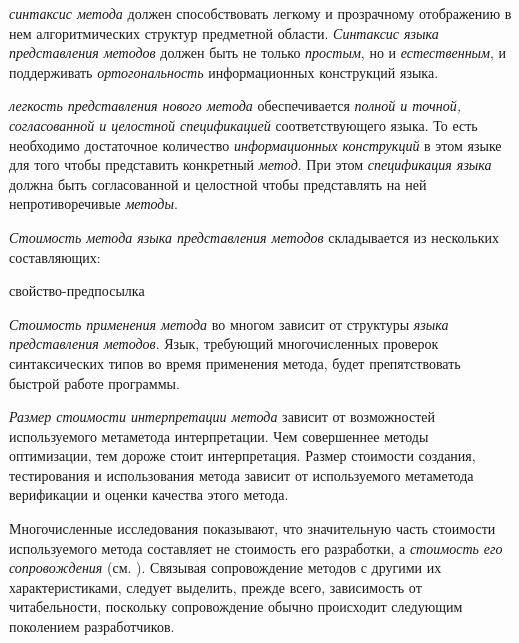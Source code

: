 \textit{синтаксис метода} должен способствовать легкому и прозрачному отображению в нем алгоритмических структур предметной области. \textit{Синтаксис языка представления методов} должен быть не только \textit{простым}, но и \textit{естественным}, и поддерживать \textit{ортогональность} информационных конструкций языка.

\textit{легкость представления нового метода} обеспечивается \textit{полной и точной, согласованной и целостной спецификацией} соответствующего языка. То есть необходимо достаточное количество \textit{информационных конструкций} в этом языке для того чтобы представить конкретный \textit{метод}. При этом \textit{спецификация языка} должна быть согласованной и целостной чтобы представлять на ней непротиворечивые \textit{методы}.

\textit{Стоимость метода языка представления методов} складывается из нескольких составляющих:

\begin{SCn}
\begin{scnrelfromlist}{свойство-предпосылка}
\end{scnrelfromlist}
\end{SCn}

\textit{Стоимость применения метода} во многом зависит от структуры \textit{языка представления методов}. Язык, требующий многочисленных проверок синтаксических типов во время применения метода, будет препятствовать быстрой работе программы.

\textit{Размер стоимости интерпретации метода} зависит от возможностей используемого метаметода интерпретации. Чем совершеннее методы оптимизации, тем дороже стоит интерпретация.
Размер стоимости создания, тестирования и использования метода зависит от используемого метаметода верификации и оценки качества этого метода.

Многочисленные исследования показывают, что значительную часть стоимости используемого метода составляет не стоимость его разработки, а \textit{стоимость его сопровождения} (см. ). Связывая сопровождение методов с другими их характеристиками, следует выделить, прежде всего, зависимость от читабельности, поскольку сопровождение обычно происходит следующим поколением разработчиков.

